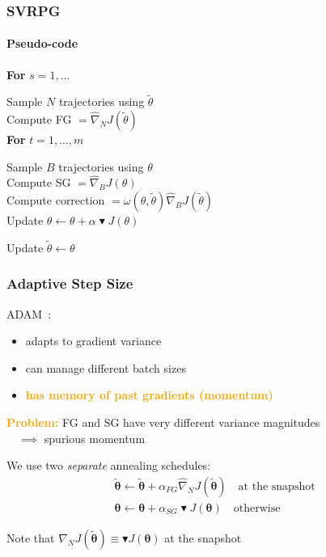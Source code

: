 \documentclass[aspectratio=169]{beamer}
\newcommand{\eno}[1]{\textcolor{orange}{\textbf{#1}}}
\newcommand{\vtheta}{\boldsymbol{\theta}}
\newcommand{\gradBlack}[1]{\blacktriangledown J(#1)}
\begin{document}

\begin{frame} 
\frametitle{SVRPG} 
\framesubtitle{Pseudo-code}

\textbf{For} $s = 1,\ldots$
\vspace*{-.2cm}
\begin{rightbrace2}
	Sample $N$ trajectories using $\widetilde{\theta}$\\
	Compute FG $=\widehat{\nabla}_N J(\widetilde{\theta})$\\
	\textbf{For} $t = 1, \ldots, m$
	\vspace*{-.15cm}
	\begin{rightbrace1}
		Sample $B$ trajectories using $\theta$\\
		Compute SG $=\widehat{\nabla}_B J(\theta)$\\
		Compute correction $=\omega(\theta, \widetilde{\theta})\widehat{\nabla}_B J(\widetilde{\theta})$\\
		Update $\theta\gets\theta+\alpha\gradBlack{\theta}$
	\end{rightbrace1}
	\vspace*{-.15cm}
	Update $\widetilde{\theta}\gets\theta$
\end{rightbrace2}
\vspace*{-.2cm}

\end{frame}

\begin{frame} 
\frametitle{Adaptive Step Size} 
ADAM~\citep{kingma2014adam}:
\begin{itemize}
	\item adapts to gradient variance
	\item can manage different batch sizes
	\item \eno{has memory of past gradients (momentum)}
\end{itemize}
\vfill

\eno{Problem:} FG and SG have very different variance magnitudes \\
$\quad\implies$ spurious momentum
\vfill

We use two \textit{separate} annealing schedules:
\begin{align*}
&\widetilde{\vtheta} \gets \widetilde{\vtheta} + \alpha_{FG}\widehat{\nabla}_NJ(\widetilde{\vtheta})\quad\text{at the snapshot}\\ 
&\vtheta \gets \vtheta + \alpha_{SG}\gradBlack{\vtheta}\quad\text{otherwise}
\end{align*}
\vfill

Note that $\widehat{\nabla}_NJ(\widetilde{\vtheta})\equiv\gradBlack{\vtheta}$ at the snapshot

\end{frame}
\end{document}
